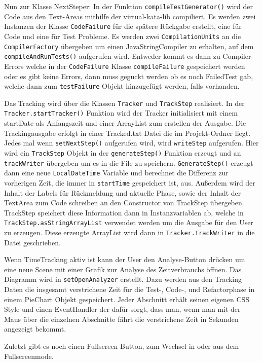 \documentclass[10pt]{article}
\begin{document}
Nun zur Klasse NextSteper:
In der Funktion \verb+compileTestGenerator()+ wird der Code aus den Text-Areas mithilfe der virtual-kata-lib compiliert. Es werden zwei Instanzen der Klasse \verb+CodeFailure+ für die spätere Rückgabe erstellt, eine für Code und eine für Test Probleme. Es werden zwei \verb+CompilationUnits+ an die \verb+CompilerFactory+ übergeben um einen JavaStringCompiler zu erhalten, auf dem \verb+compileAndRunTests()+ aufgerufen wird.
Entweder kommt es dann zu Compiler-Errors welche in der \verb+CodeFailure+ Klasse \verb+compileFailure+ gespeichert werden oder es gibt keine Errors, dann muss geguckt werden ob es noch FailedTest gab, welche dann zum \verb+testFailure+ Objekt hinzugefügt werden, falls vorhanden.

Das Tracking wird über die Klassen \verb+Tracker+ und \verb+TrackStep+ realisiert.
In der \verb+Tracker.startTracker()+ Funktion wird der Tracker initialisiert mit einem startDate als Anfangszeit und einer ArrayList zum erstellen der Ausgabe. Die Trackingausgabe erfolgt in einer Tracked.txt Datei die im Projekt-Ordner liegt. Jedes mal wenn \verb+setNextStep()+ aufgerufen wird, wird \verb+writeStep+ aufgerufen. Hier wird ein \verb+TrackStep+ Objekt in der \verb+generateStep()+ Funktion erzeugt und an \verb+trackWriter+ übergeben um es in die File zu speichern. \verb+GenerateStep()+ erzeugt dann eine neue \verb+LocalDateTime+ Variable und berechnet die Differenz zur vorherigen Zeit, die immer in \verb+startTime+ gespeichert ist, aus. Außerdem wird der Inhalt der Labels für Rückmeldung und aktuelle Phase, sowie der Inhalt der TextArea zum Code schreiben an den Constructor von TrackStep übergeben.
TrackStep speichert diese Information dann in Instanzvariablen ab, welche in \verb+TrackStep.asStringArrayList+ verwendet werden um die Ausgabe für den User zu erzeugen. Diese erzeugte ArrayList wird dann in \verb+Tracker.trackWriter+ in die Datei geschrieben.

Wenn TimeTracking aktiv ist kann der User den Analyse-Button drücken um eine neue Scene mit einer Grafik zur Analyse des Zeitverbrauchs öffnen. Das Diagramm wird in \verb+setOpenAnalyzer+ erstellt. Dazu werden aus den Tracking Daten die insgesamt verstrichene Zeit für die Test-, Code-, und Refactorphase in einem PieChart Objekt gespeichert. Jeder Abschnitt erhält seinen eigenen CSS Style und einen EventHandler der dafür sorgt, dass man, wenn man mit der Maus über die einzelnen Abschnitte fährt die verstrichene Zeit in Sekunden angezeigt bekommt.

Zuletzt gibt es noch einen Fullscreen Button, zum Wechsel in oder aus dem Fullscreenmode.
\end{document}
